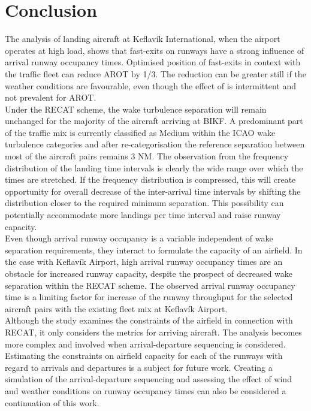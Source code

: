 \section{Conclusion\label{sec:conclusions}}
The analysis of landing aircraft at Keflavík International, when the airport operates at high load, shows that fast-exits on runways have a strong influence of arrival runway occupancy times. Optimised position of fast-exits in context with the traffic fleet can reduce AROT by 1/3. The reduction can be greater still if the weather conditions are favourable, even though the effect of is intermittent and not prevalent for AROT.\\
Under the RECAT scheme, the wake turbulence separation will remain unchanged for the majority of the aircraft arriving at BIKF. A predominant part of the traffic mix is currently classified as Medium within the ICAO wake turbulence categories and after re-categorisation the reference separation between most of the aircraft pairs remains 3 NM. The observation from the frequency distribution of the landing time intervals is clearly the wide range over which the times are stretched. If the frequency distribution is compressed, this will create opportunity for overall decrease of the inter-arrival time intervals by shifting the distribution closer to the required minimum separation. This possibility can potentially accommodate more landings per time interval and raise runway capacity.\\
Even though arrival runway occupancy is a variable independent of wake separation requirements, they interact to formulate the capacity of an airfield. In the case with Keflavík Airport, high arrival runway occupancy times are an obstacle for increased runway capacity, despite the prospect of decreased wake separation within the RECAT scheme. The observed arrival runway occupancy time is a limiting factor for increase of the runway throughput for the selected aircraft pairs with the existing fleet mix at Keflavík Airport.\\
Although the study examines the constraints of the airfield in connection with RECAT, it only considers the metrics for arriving aircraft. The analysis becomes more complex and involved when arrival-departure sequencing is considered. Estimating the constraints on airfield capacity for each of the runways with regard to arrivals and departures is a subject for future work. Creating a simulation of the arrival-departure sequencing and assessing the effect of wind and weather conditions on runway occupancy times can also be considered a continuation of this work.



